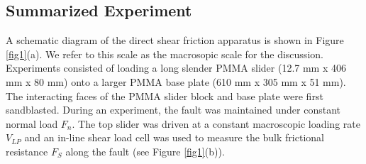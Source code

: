 \documentclass[final,3p, 11pt,authoryear]{elsarticle}
\begin{document}
\subsection{Summarized Experiment}
\label{GeneralExp}
A schematic diagram of the direct shear friction apparatus is shown in Figure \ref{fig1}(a). We refer to this scale as the macrosopic scale for the discussion. Experiments consisted of loading a long slender PMMA slider (12.7 mm x 406 mm x 80 mm) onto a larger PMMA base plate (610 mm x 305 mm x 51 mm). The interacting faces of the PMMA slider block and base plate were first sandblasted. During an experiment, the fault was maintained under constant normal load $F_{n}$.  The top slider was driven at a constant macroscopic loading rate $V_{LP}$ and an in-line shear load cell was used to measure the bulk frictional resistance $F_{S}$ along the fault (see Figure \ref{fig1}(b)).   
  
\end{document}
